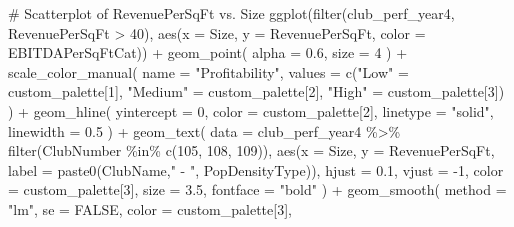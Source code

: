 \documentclass[
  letterpaper,
  oneside,
  11pt]{article}
\newenvironment{Shaded}{\begin{snugshade}}{\end{snugshade}}
\newcommand{\AttributeTok}[1]{\textcolor[rgb]{0.40,0.45,0.13}{#1}}
\newcommand{\CommentTok}[1]{\textcolor[rgb]{0.37,0.37,0.37}{#1}}
\newcommand{\ConstantTok}[1]{\textcolor[rgb]{0.56,0.35,0.01}{#1}}
\newcommand{\DecValTok}[1]{\textcolor[rgb]{0.68,0.00,0.00}{#1}}
\newcommand{\FloatTok}[1]{\textcolor[rgb]{0.68,0.00,0.00}{#1}}
\newcommand{\FunctionTok}[1]{\textcolor[rgb]{0.28,0.35,0.67}{#1}}
\newcommand{\NormalTok}[1]{\textcolor[rgb]{0.00,0.23,0.31}{#1}}
\newcommand{\OtherTok}[1]{\textcolor[rgb]{0.00,0.23,0.31}{#1}}
\newcommand{\SpecialCharTok}[1]{\textcolor[rgb]{0.37,0.37,0.37}{#1}}
\newcommand{\StringTok}[1]{\textcolor[rgb]{0.13,0.47,0.30}{#1}}
\begin{document}
\begin{Shaded}
\begin{Highlighting}[]
\CommentTok{\# Scatterplot of RevenuePerSqFt vs. Size}
\FunctionTok{ggplot}\NormalTok{(}\FunctionTok{filter}\NormalTok{(club\_perf\_year4, RevenuePerSqFt }\SpecialCharTok{\textgreater{}} \DecValTok{40}\NormalTok{),}
       \FunctionTok{aes}\NormalTok{(}\AttributeTok{x =}\NormalTok{ Size, }\AttributeTok{y =}\NormalTok{ RevenuePerSqFt, }\AttributeTok{color =}\NormalTok{ EBITDAPerSqFtCat)) }\SpecialCharTok{+}
  \FunctionTok{geom\_point}\NormalTok{(}
    \AttributeTok{alpha =} \FloatTok{0.6}\NormalTok{,}
    \AttributeTok{size =} \DecValTok{4}
\NormalTok{  ) }\SpecialCharTok{+}
  \FunctionTok{scale\_color\_manual}\NormalTok{(}
    \AttributeTok{name =} \StringTok{"Profitability"}\NormalTok{,}
    \AttributeTok{values =} \FunctionTok{c}\NormalTok{(}\StringTok{"Low"} \OtherTok{=}\NormalTok{ custom\_palette[}\DecValTok{1}\NormalTok{], }\StringTok{"Medium"} \OtherTok{=}\NormalTok{ custom\_palette[}\DecValTok{2}\NormalTok{], }\StringTok{"High"} \OtherTok{=}\NormalTok{ custom\_palette[}\DecValTok{3}\NormalTok{])}
\NormalTok{  ) }\SpecialCharTok{+}
  \FunctionTok{geom\_hline}\NormalTok{(}
    \AttributeTok{yintercept =} \DecValTok{0}\NormalTok{,}
    \AttributeTok{color =}\NormalTok{ custom\_palette[}\DecValTok{2}\NormalTok{],}
    \AttributeTok{linetype =} \StringTok{"solid"}\NormalTok{,}
    \AttributeTok{linewidth =} \FloatTok{0.5}
\NormalTok{  ) }\SpecialCharTok{+}
  \FunctionTok{geom\_text}\NormalTok{(}
    \AttributeTok{data =}\NormalTok{ club\_perf\_year4 }\SpecialCharTok{\%\textgreater{}\%} \FunctionTok{filter}\NormalTok{(ClubNumber }\SpecialCharTok{\%in\%} \FunctionTok{c}\NormalTok{(}\DecValTok{105}\NormalTok{, }\DecValTok{108}\NormalTok{, }\DecValTok{109}\NormalTok{)),}
    \FunctionTok{aes}\NormalTok{(}\AttributeTok{x =}\NormalTok{ Size, }\AttributeTok{y =}\NormalTok{ RevenuePerSqFt, }\AttributeTok{label =} \FunctionTok{paste0}\NormalTok{(ClubName,}\StringTok{" {-} "}\NormalTok{, PopDensityType)),}
    \AttributeTok{hjust =} \FloatTok{0.1}\NormalTok{,}
    \AttributeTok{vjust =} \SpecialCharTok{{-}}\DecValTok{1}\NormalTok{,}
    \AttributeTok{color =}\NormalTok{ custom\_palette[}\DecValTok{3}\NormalTok{],}
    \AttributeTok{size =} \FloatTok{3.5}\NormalTok{,}
    \AttributeTok{fontface =} \StringTok{"bold"}
\NormalTok{  ) }\SpecialCharTok{+}
  \FunctionTok{geom\_smooth}\NormalTok{(}
    \AttributeTok{method =} \StringTok{"lm"}\NormalTok{,}
    \AttributeTok{se =} \ConstantTok{FALSE}\NormalTok{,}
    \AttributeTok{color =}\NormalTok{ custom\_palette[}\DecValTok{3}\NormalTok{],}

\end{Highlighting}
\end{Shaded}
\end{document}
